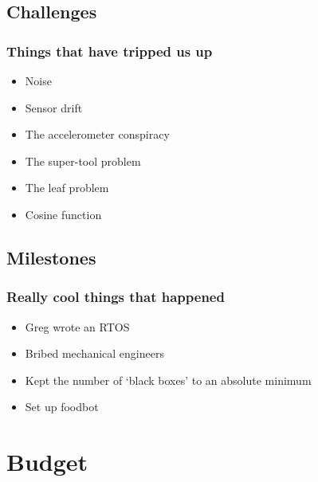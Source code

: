 \documentclass{beamer}
\begin{document}
\subsection{Challenges}
\frame
{
    \frametitle{Things that have tripped us up}
    \begin{itemize}
        \item Noise
        \item Sensor drift
        \item The accelerometer conspiracy
        \item The super-tool problem
        \item The leaf problem
        \item Cosine function
    \end{itemize}
}
\subsection{Milestones}
\frame
{
    \frametitle{Really cool things that happened}
    \begin{itemize}
        \item Greg wrote an RTOS
        \item Bribed mechanical engineers
        \item Kept the number of `black boxes' to an absolute minimum
        \item Set up foodbot
    \end{itemize}
}

\section{Budget}
\end{document}
